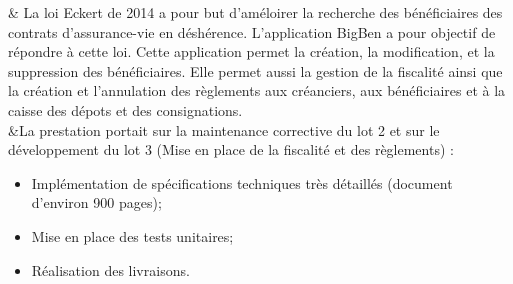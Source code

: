 
& La loi Eckert de 2014 a pour but d'améloirer la recherche des bénéficiaires des contrats d’assurance-vie en déshérence.
L'application BigBen a pour objectif de répondre à cette loi. Cette application permet la création, la modification, et la suppression des bénéficiaires. 
Elle permet aussi la gestion de la fiscalité ainsi que la création et l'annulation des règlements aux créanciers, aux bénéficiaires et à la caisse des dépots et des consignations.\\
&La prestation portait sur la maintenance corrective du lot 2 et sur le développement du lot 3 (Mise en place de la fiscalité et des règlements) :
\begin{itemize}%
	\item Implémentation de spécifications techniques très détaillés (document d'environ 900 pages);%
	\item Mise en place des tests unitaires;%
	\item Réalisation des livraisons.%
\end{itemize}%

